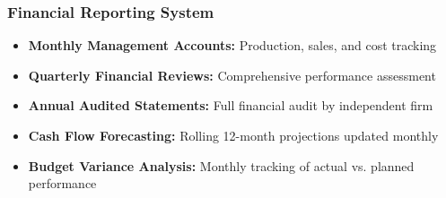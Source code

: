 \subsubsection{Financial Reporting System}
\begin{itemize}
    \item \textbf{Monthly Management Accounts:} Production, sales, and cost tracking
    \item \textbf{Quarterly Financial Reviews:} Comprehensive performance assessment
    \item \textbf{Annual Audited Statements:} Full financial audit by independent firm
    \item \textbf{Cash Flow Forecasting:} Rolling 12-month projections updated monthly
    \item \textbf{Budget Variance Analysis:} Monthly tracking of actual vs. planned performance
\end{itemize}
